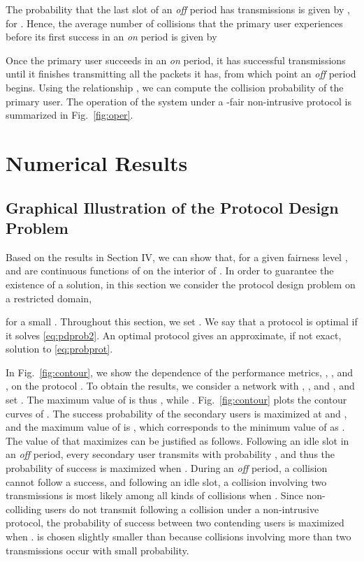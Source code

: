 \documentclass[12pt,draftclsnofoot,onecolumn]{IEEEtran}
\begin{document}
The probability that the last slot of an \emph{off} period
has  transmissions is given by , for .
Hence, the average number of collisions that the primary user experiences
before its first success in an \emph{on} period is given by

Once the primary user succeeds in an \emph{on} period, it
has successful transmissions until it finishes transmitting
all the packets it has, from which point an \emph{off} period begins.
Using the relationship , we can
compute the collision probability of the primary user.
The operation of the system under a -fair non-intrusive protocol is summarized in Fig.~\ref{fig:oper}.

\section{Numerical Results}

\subsection{Graphical Illustration of the Protocol Design Problem} \label{sec:graph}

Based on the results in Section IV, we can show that, for a given fairness level ,
 and  are continuous functions of  on the
interior of . In order to guarantee the existence of a solution,
in this section we consider the protocol design problem on a restricted domain,

for a small . Throughout this section, we set .
We say that a protocol is optimal if it solves \eqref{eq:pdprob2}.
An optimal protocol gives an approximate, if not exact, solution to \eqref{eq:probprot}.

In Fig.~\ref{fig:contour}, we show the dependence of the performance metrics,
, , and , on the protocol . To obtain the results, we consider a network with
, , and , and set . The maximum value of
 is thus , while .
Fig.~\ref{fig:contour} plots
the contour curves of . The success probability of the secondary users 
is maximized at  and , and the maximum value
of  is , which corresponds to the minimum value of 
as .
The value of  that maximizes  can be justified as follows. Following an idle slot
in an \emph{off} period, every secondary user transmits with probability , and thus the probability of success
is maximized when  \cite{massey}. During an \emph{off} period, a collision cannot follow a success, and
following an idle slot, a collision involving two transmissions is most likely among all kinds of collisions
when . Since non-colliding users do not transmit following a collision under a non-intrusive protocol,
the probability of success between two contending users is maximized when .
 is chosen slightly smaller than  because collisions involving
more than two transmissions occur with small probability.
\end{document}
